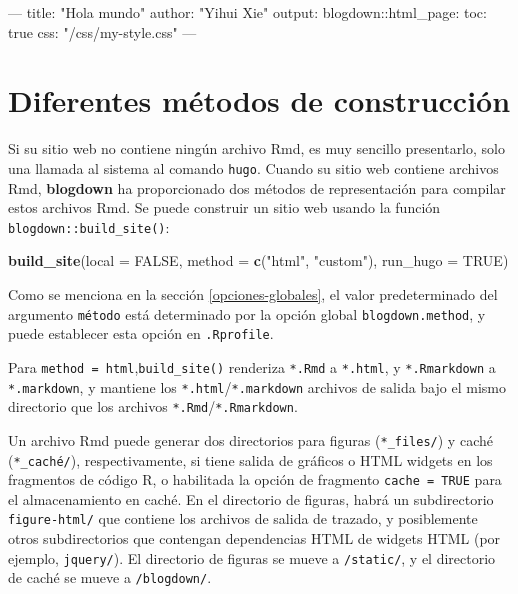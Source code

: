 \documentclass[12pt,]{krantz}
\makeatletter
\newenvironment{Shaded}{\begin{snugshade}}{\end{snugshade}}
\newcommand{\AttributeTok}[1]{\textcolor[rgb]{0.77,0.63,0.00}{#1}}
\newcommand{\DataTypeTok}[1]{\textcolor[rgb]{0.13,0.29,0.53}{#1}}
\newcommand{\FunctionTok}[1]{\textcolor[rgb]{0.00,0.00,0.00}{#1}}
\newcommand{\KeywordTok}[1]{\textcolor[rgb]{0.13,0.29,0.53}{\textbf{#1}}}
\newcommand{\NormalTok}[1]{#1}
\newcommand{\OtherTok}[1]{\textcolor[rgb]{0.56,0.35,0.01}{#1}}
\newcommand{\StringTok}[1]{\textcolor[rgb]{0.31,0.60,0.02}{#1}}
\newenvironment{kframe}{%
\medskip{}
\setlength{\fboxsep}{.8em}
 \def\at@end@of@kframe{}%
 \ifinner\ifhmode%
  \def\at@end@of@kframe{\end{minipage}}%
  \begin{minipage}{\columnwidth}%
 \fi\fi%
 \def\FrameCommand##1{\hskip\@totalleftmargin \hskip-\fboxsep
 \colorbox{shadecolor}{##1}\hskip-\fboxsep
     \hskip-\linewidth \hskip-\@totalleftmargin \hskip\columnwidth}%
 \MakeFramed {\advance\hsize-\width
   \@totalleftmargin\z@ \linewidth\hsize
   \@setminipage}}%
 {\par\unskip\endMakeFramed%
 \at@end@of@kframe}
\renewenvironment{Shaded}{\begin{kframe}}{\end{kframe}}
\theoremstyle{definition}
\theoremstyle{definition}
\theoremstyle{definition}
\theoremstyle{remark}
\makeatother
\begin{document}
\begin{Shaded}
\begin{Highlighting}[]
\OtherTok{---}
\FunctionTok{title:}\AttributeTok{ }\StringTok{"Hola mundo"}
\FunctionTok{author:}\AttributeTok{ }\StringTok{"Yihui Xie"}
\FunctionTok{output:}
  \FunctionTok{blogdown:}\AttributeTok{:html_page:}
    \FunctionTok{toc:}\AttributeTok{ true}
    \FunctionTok{css:}\AttributeTok{ }\StringTok{"/css/my-style.css"}
\OtherTok{---}
\end{Highlighting}
\end{Shaded}

\hypertarget{muxe9todos}{%
\section{Diferentes métodos de construcción}\label{muxe9todos}}

Si su sitio web no contiene ningún archivo Rmd, es muy sencillo
presentarlo, solo una llamada al sistema al comando \texttt{hugo}.
Cuando su sitio web contiene archivos Rmd, \textbf{blogdown} ha
proporcionado dos métodos de representación para compilar estos archivos
Rmd. Se puede construir un sitio web usando la función
\texttt{blogdown::build\_site()}:

\begin{Shaded}
\begin{Highlighting}[]
\KeywordTok{build_site}\NormalTok{(}\DataTypeTok{local =} \OtherTok{FALSE}\NormalTok{, }\DataTypeTok{method =} \KeywordTok{c}\NormalTok{(}\StringTok{"html"}\NormalTok{, }\StringTok{"custom"}\NormalTok{),}
  \DataTypeTok{run_hugo =} \OtherTok{TRUE}\NormalTok{)}
\end{Highlighting}
\end{Shaded}

Como se menciona en la sección \ref{opciones-globales}, el valor
predeterminado del argumento \texttt{método} está determinado por la
opción global \texttt{blogdown.method}, y puede establecer esta opción
en \texttt{.Rprofile}.

Para
\texttt{method\ =\ \textquotesingle{}html\textquotesingle{}},\texttt{build\_site()}
renderiza \texttt{*.Rmd} a \texttt{*.html}, y \texttt{*.Rmarkdown} a
\texttt{*.markdown}, y mantiene los \texttt{*.html}/\texttt{*.markdown}
archivos de salida bajo el mismo directorio que los archivos
\texttt{*.Rmd}/\texttt{*.Rmarkdown}.

Un archivo Rmd puede generar dos directorios para figuras
(\texttt{*\_files/}) y caché (\texttt{*\_caché/}), respectivamente, si
tiene salida de gráficos o HTML widgets \citep{R-htmlwidgets} en los
fragmentos de código R, o habilitada la opción de fragmento
\texttt{cache\ =\ TRUE} para el almacenamiento en caché. En el
directorio de figuras, habrá un subdirectorio \texttt{figure-html/} que
contiene los archivos de salida de trazado, y posiblemente otros
subdirectorios que contengan dependencias HTML de widgets HTML (por
ejemplo, \texttt{jquery/}). El directorio de figuras se mueve a
\texttt{/static/}, y el directorio de caché se mueve a
\texttt{/blogdown/}.
\end{document}
